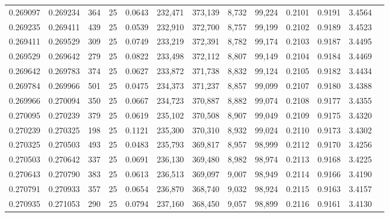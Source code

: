 \begin{tabular}{rrrrrrrrrrrrr}
0.269097 & 0.269234 &   364 &  25 &                                     0.0643 & 232,471 & 373,139 &   8,732 &  99,224 & 0.2101 & 0.9191 & 3.4564 \\
0.269235 & 0.269411 &   439 &  25 &                                     0.0539 & 232,910 & 372,700 &   8,757 &  99,199 & 0.2102 & 0.9189 & 3.4523 \\
0.269411 & 0.269529 &   309 &  25 &                                     0.0749 & 233,219 & 372,391 &   8,782 &  99,174 & 0.2103 & 0.9187 & 3.4495 \\
0.269529 & 0.269642 &   279 &  25 &                                     0.0822 & 233,498 & 372,112 &   8,807 &  99,149 & 0.2104 & 0.9184 & 3.4469 \\
0.269642 & 0.269783 &   374 &  25 &                                     0.0627 & 233,872 & 371,738 &   8,832 &  99,124 & 0.2105 & 0.9182 & 3.4434 \\
0.269784 & 0.269966 &   501 &  25 &                                     0.0475 & 234,373 & 371,237 &   8,857 &  99,099 & 0.2107 & 0.9180 & 3.4388 \\
0.269966 & 0.270094 &   350 &  25 &                                     0.0667 & 234,723 & 370,887 &   8,882 &  99,074 & 0.2108 & 0.9177 & 3.4355 \\
0.270095 & 0.270239 &   379 &  25 &                                     0.0619 & 235,102 & 370,508 &   8,907 &  99,049 & 0.2109 & 0.9175 & 3.4320 \\
0.270239 & 0.270325 &   198 &  25 &                                     0.1121 & 235,300 & 370,310 &   8,932 &  99,024 & 0.2110 & 0.9173 & 3.4302 \\
0.270325 & 0.270503 &   493 &  25 &                                     0.0483 & 235,793 & 369,817 &   8,957 &  98,999 & 0.2112 & 0.9170 & 3.4256 \\
0.270503 & 0.270642 &   337 &  25 &                                     0.0691 & 236,130 & 369,480 &   8,982 &  98,974 & 0.2113 & 0.9168 & 3.4225 \\
0.270643 & 0.270790 &   383 &  25 &                                     0.0613 & 236,513 & 369,097 &   9,007 &  98,949 & 0.2114 & 0.9166 & 3.4190 \\
0.270791 & 0.270933 &   357 &  25 &                                     0.0654 & 236,870 & 368,740 &   9,032 &  98,924 & 0.2115 & 0.9163 & 3.4157 \\
0.270935 & 0.271053 &   290 &  25 &                                     0.0794 & 237,160 & 368,450 &   9,057 &  98,899 & 0.2116 & 0.9161 & 3.4130 \\

\end{tabular}
